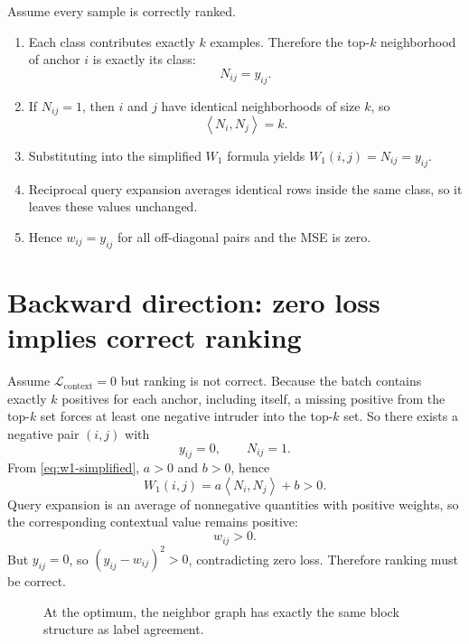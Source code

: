 \documentclass[11pt,oneside,openany]{book}
\theoremstyle{myplain}
\theoremstyle{definition}
\newcommand{\inner}[2]{\left\langle #1,#2\right\rangle}
\begin{document}
Assume every sample is correctly ranked.

\begin{enumerate}[leftmargin=*,label=\textbf{Step \arabic*.},itemsep=5pt]
  \item Each class contributes exactly $k$ examples. Therefore the top-$k$ neighborhood of anchor $i$ is exactly its class:
  \[
    N_{ij}=y_{ij}.
  \]
  \item If $N_{ij}=1$, then $i$ and $j$ have identical neighborhoods of size $k$, so
  \[
    \inner{N_i}{N_j}=k.
  \]
  \item Substituting into the simplified $W_1$ formula yields $W_1(i,j)=N_{ij}=y_{ij}$.
  \item Reciprocal query expansion averages identical rows inside the same class, so it leaves these values unchanged.
  \item Hence $w_{ij}=y_{ij}$ for all off-diagonal pairs and the MSE is zero.
\end{enumerate}

\section{Backward direction: zero loss implies correct ranking}

Assume $\mathcal L_{\mathrm{context}}=0$ but ranking is not correct. Because the batch contains exactly $k$ positives for each anchor, including itself, a missing positive from the top-$k$ set forces at least one negative intruder into the top-$k$ set. So there exists a negative pair $(i,j)$ with
\[
  y_{ij}=0,\qquad N_{ij}=1.
\]
From \cref{eq:w1-simplified}, $a>0$ and $b>0$, hence
\[
  W_1(i,j)=a\inner{N_i}{N_j}+b>0.
\]
Query expansion is an average of nonnegative quantities with positive weights, so the corresponding contextual value remains positive:
\[
  w_{ij}>0.
\]
But $y_{ij}=0$, so $(y_{ij}-w_{ij})^2>0$, contradicting zero loss. Therefore ranking must be correct.

\begin{figure}[H]
\centering
{}
\caption{At the optimum, the neighbor graph has exactly the same block structure as label agreement.}
\label{fig:proof-matrix}
\end{figure}
\end{document}
